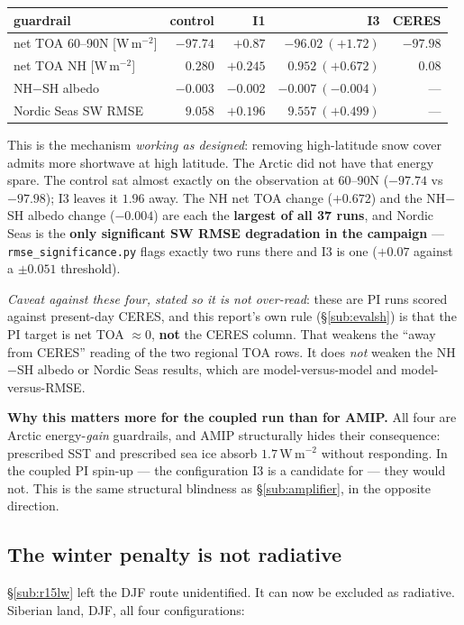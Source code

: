 \documentclass[10pt]{article}
\begin{document}
\begin{center}\footnotesize
\begin{tabular}{l r r r r}
\toprule
guardrail & control & I1 & \textbf{I3} & CERES \\
\midrule
net TOA 60--90N [W\,m$^{-2}$] & $-97.74$ & $+0.87$ & $\mathbf{-96.02\ (+1.72)}$ & $\mathbf{-97.98}$ \\
net TOA NH [W\,m$^{-2}$] & $0.280$ & $+0.245$ & $\mathbf{0.952\ (+0.672)}$ & $\mathbf{0.08}$ \\
NH$-$SH albedo & $-0.003$ & $-0.002$ & $\mathbf{-0.007\ (-0.004)}$ & --- \\
Nordic Seas SW RMSE & $9.058$ & $+0.196$ & $\mathbf{9.557\ (+0.499)}$ & --- \\
\bottomrule
\end{tabular}
\end{center}

\noindent This is the mechanism \emph{working as designed}: removing high-latitude snow cover
admits more shortwave at high latitude. The Arctic did not have that energy spare. The control
sat almost exactly on the observation at 60--90N ($-97.74$ vs $-97.98$); I3 leaves it $1.96$
away. The NH net TOA change ($+0.672$) and the NH$-$SH albedo change ($-0.004$) are each the
\textbf{largest of all 37 runs}, and Nordic Seas is the \textbf{only significant SW RMSE
degradation in the campaign} --- \texttt{rmse\_significance.py} flags exactly two runs there and
I3 is one ($+0.07$ against a $\pm0.051$ threshold).

\emph{Caveat against these four, stated so it is not over-read}: these are PI runs scored
against present-day CERES, and this report's own rule (\S\ref{sub:evalsh}) is that the PI
target is net TOA ${\approx}0$, \textbf{not} the CERES column. That weakens the
``away from CERES'' reading of the two regional TOA rows. It does \emph{not} weaken the
NH$-$SH albedo or Nordic Seas results, which are model-versus-model and model-versus-RMSE.

\textbf{Why this matters more for the coupled run than for AMIP.} All four are Arctic
energy-\emph{gain} guardrails, and AMIP structurally hides their consequence: prescribed SST
and prescribed sea ice absorb $1.7$\,W\,m$^{-2}$ without responding. In the coupled PI
spin-up --- the configuration I3 is a candidate for --- they would not. This is the same
structural blindness as \S\ref{sub:amplifier}, in the opposite direction.

\subsection{The winter penalty is not radiative}\label{sub:djfnotrad}
\S\ref{sub:r15lw} left the DJF route unidentified. It can now be excluded as radiative.
Siberian land, DJF, all four configurations:
\end{document}
